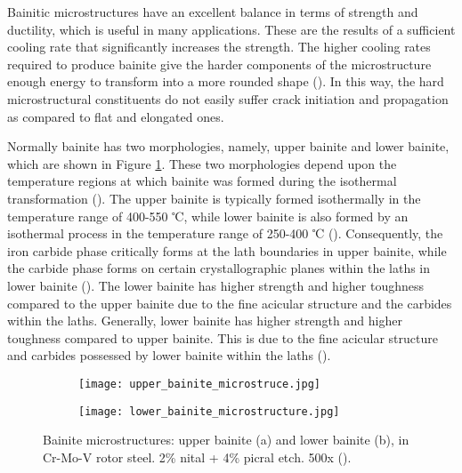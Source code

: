 Bainitic microstructures have an excellent balance in terms of strength and ductility, which is useful in many applications. These are the results of a sufficient cooling rate that significantly increases the strength. The higher cooling rates required to produce bainite give the harder components of the microstructure enough energy to transform into a more rounded shape (\cite{bajaj2020steels}). In this way, the hard microstructural constituents do not easily suffer crack initiation and propagation as compared to flat and elongated ones.

Normally bainite has two morphologies, namely, upper bainite and lower bainite, which are shown in Figure \ref{ch3:figure:bainite:microstructures}. These two morphologies depend upon the temperature regions at which bainite was formed during the isothermal transformation (\cite{molabe2018determining}). The upper bainite is typically formed isothermally in the temperature range of 400-550 ℃, while lower bainite is also formed by an isothermal process in the temperature range of 250-400 ℃ (\cite{molabe2018determining}). Consequently, the iron carbide phase critically forms at the lath boundaries in upper bainite, while the carbide phase forms on certain crystallographic planes within the laths in lower bainite (\cite{bajaj2020steels}). The lower bainite has higher strength and higher toughness compared to the upper bainite due to the fine acicular structure and the carbides within the laths. Generally, lower bainite has higher strength and higher toughness compared to upper bainite. This is due to the fine acicular structure and carbides possessed by lower bainite within the laths (\cite{molabe2018determining}).
     
\begin{figure}[H]

\centering
\begin{subfigure}{.45\textwidth}
    \centering
    \texttt{[image: upper\_bainite\_microstruce.jpg]}
    \caption{}
\end{subfigure}
\begin{subfigure}{.45\textwidth}
    \centering
    \texttt{[image: lower\_bainite\_microstructure.jpg]}
    \caption{}
\end{subfigure}

\caption{Bainite microstructures: upper bainite (a) and lower bainite (b), in Cr-Mo-V rotor steel. 2\% nital + 4\% picral etch. 500x (\cite{molabe2018determining}).}
\label{ch3:figure:bainite:microstructures}
\end{figure}

